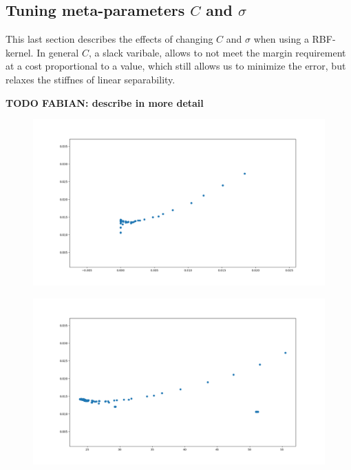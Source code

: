 \subsection{Tuning meta-parameters $C$ and $\sigma$}

This last section describes the effects of changing $C$ and $\sigma$ when using a RBF-kernel. In general $C$, a slack varibale, allows to not meet the margin requirement at a cost proportional to a value, which still allows us to minimize the error, but relaxes the stiffnes of linear separability.


\textbf{TODO FABIAN: describe in more detail}

\begin{figure}[!h]
\begin{center}
\centering
\includegraphics[width=1\textwidth]{figures/new/3_Figure_1}
\end{center}
\caption{\label{fig:3_1} }
\end{figure}


\begin{figure}[!h]
\begin{center}
\centering
\includegraphics[width=1\textwidth]{figures/new/3_Figure_2}
\end{center}
\caption{\label{fig:3_2} }
\end{figure}

